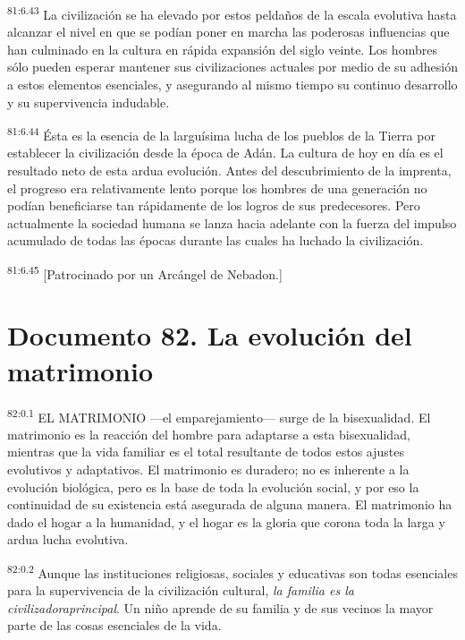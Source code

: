 \documentclass[twoside, 11pt]{book}
\begin{document}
\par
\textsuperscript{81:6.43} La civilización se ha elevado por estos peldaños de la escala evolutiva hasta alcanzar el nivel en que se podían poner en marcha las poderosas influencias que han culminado en la cultura en rápida expansión del siglo veinte. Los hombres sólo pueden esperar mantener sus civilizaciones actuales por medio de su adhesión a estos elementos esenciales, y asegurando al mismo tiempo su continuo desarrollo y su supervivencia indudable.

\par
\textsuperscript{81:6.44} Ésta es la esencia de la larguísima lucha de los pueblos de la Tierra por establecer la civilización desde la época de Adán. La cultura de hoy en día es el resultado neto de esta ardua evolución. Antes del descubrimiento de la imprenta, el progreso era relativamente lento porque los hombres de una generación no podían beneficiarse tan rápidamente de los logros de sus predecesores. Pero actualmente la sociedad humana se lanza hacia adelante con la fuerza del impulso acumulado de todas las épocas durante las cuales ha luchado la civilización.

\par
\textsuperscript{81:6.45} [Patrocinado por un Arcángel de Nebadon.]


\chapter{Documento 82. La evolución del matrimonio}
\par
\textsuperscript{82:0.1} EL MATRIMONIO ---el emparejamiento--- surge de la bisexualidad. El matrimonio es la reacción del hombre para adaptarse a esta bisexualidad, mientras que la vida familiar es el total resultante de todos estos ajustes evolutivos y adaptativos. El matrimonio es duradero; no es inherente a la evolución biológica, pero es la base de toda la evolución social, y por eso la continuidad de su existencia está asegurada de alguna manera. El matrimonio ha dado el hogar a la humanidad, y el hogar es la gloria que corona toda la larga y ardua lucha evolutiva.

\par
\textsuperscript{82:0.2} Aunque las instituciones religiosas, sociales y educativas son todas esenciales para la supervivencia de la civilización cultural, \textit{la familia es la civilizadoraprincipal}. Un niño aprende de su familia y de sus vecinos la mayor parte de las cosas esenciales de la vida.
\end{document}
